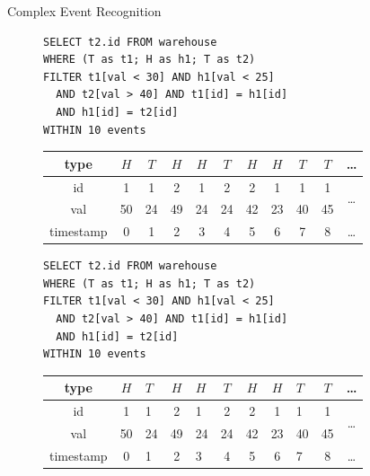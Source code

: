 \documentclass[xcolor=pdftex,dvipsnames,table]{beamer}
\begin{document}
\begin{frame}{Complex Event Recognition}
 \begin{block}{}
    \begin{figure}[H]
      \begin{verbatim}
SELECT t2.id FROM warehouse
WHERE (T as t1; H as h1; T as t2)
FILTER t1[val < 30] AND h1[val < 25]
  AND t2[val > 40] AND t1[id] = h1[id]
  AND h1[id] = t2[id]
WITHIN 10 events
      \end{verbatim}
    \end{figure}
    \begin{figure}[H]
      \centering
      \begin{tabular}{|c|c|c|c|c|c|c|c|c|c|c}\hline
        type  &$H$&$T$&$H$&$H$&$T$&$H$&$H$&$T$&$T$ & \ldots \\ \hline
        id  & 1 & 1 & 2 & 1 & 2 & 2 & 1 & 1 & 1 & \multirow{2}{*}{\ldots} \\
        val & 50 & 24& 49& 24& 24& 42& 23& 40& 45\\ \hline
        timestamp & 0 & 1 & 2 & 3 & 4 & 5 & 6 & 7 & 8 & \ldots \\ \hline
      \end{tabular}
    \end{figure}
 \end{block}

 \framebreak

 \begin{block}{}
    \begin{figure}[H]
      \begin{verbatim}
SELECT t2.id FROM warehouse
WHERE (T as t1; H as h1; T as t2)
FILTER t1[val < 30] AND h1[val < 25]
  AND t2[val > 40] AND t1[id] = h1[id]
  AND h1[id] = t2[id]
WITHIN 10 events
      \end{verbatim}
    \end{figure}
    \begin{figure}[H]
      \centering
      \begin{tabular}{|c|c|a|c|a|c|c|c|a|c|c}\hline
        type  &$H$&$T$&$H$&$H$&$T$&$H$&$H$&$T$&$T$ & \ldots \\ \hline
        id  & 1 & 1 & 2 & 1 & 2 & 2 & 1 & 1 & 1 &  \\
        val & 50 & 24& 49& 24& 24& 42& 23& 40& 45\\ \hline
        timestamp & 0 & 1 & 2 & 3 & 4 & 5 & 6 & 7 & 8 & \ldots \\ \hline
      \end{tabular}
    \end{figure}
 \end{block}


\end{frame}
\end{document}
